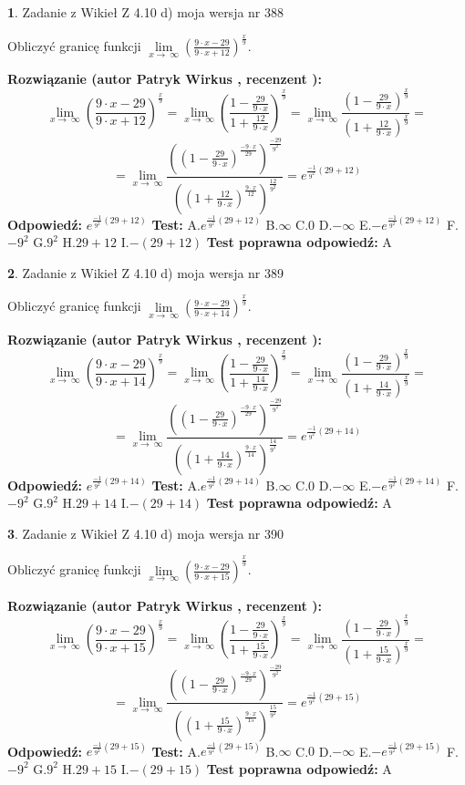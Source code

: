 \documentclass[12pt, a4paper]{article}
\theoremstyle{definition} %
\newtheorem{zad}{}
\newcommand{\zadStart}[1]{\begin{zad}#1\newline}
\newcommand{\zadStop}{\end{zad}}
\newcommand{\rozwStart}[2]{\noindent \textbf{Rozwiązanie (autor #1 , recenzent #2): }\newline}
\newcommand{\rozwStop}{\newline}
\newcommand{\odpStart}{\noindent \textbf{Odpowiedź:}\newline}
\newcommand{\odpStop}{\newline}
\newcommand{\testStart}{\noindent \textbf{Test:}\newline}
\newcommand{\testStop}{\newline}
\newcommand{\kluczStart}{\noindent \textbf{Test poprawna odpowiedź:}\newline}
\newcommand{\kluczStop}{\newline}
\begin{document}
\zadStart{Zadanie z Wikieł Z 4.10 d) moja wersja nr 388}


Obliczyć granicę funkcji  $\lim\limits_{x\to\ \infty}(\frac{9\cdot x-29}{9\cdot x+12})^{\frac{x}{9}}$.
\zadStop
\rozwStart{Patryk Wirkus}{}
$$\lim\limits_{x\to\ \infty}(\frac{9\cdot x-29}{9\cdot x+12})^{\frac{x}{9}} = \lim\limits_{x\to\ \infty}(\frac{1-\frac{29}{9\cdot x}}{1+\frac{12}{9\cdot x}})^{\frac{x}{9}}=\lim\limits_{x\to\ \infty}\frac{(1-\frac{29}{9\cdot x})^{\frac{x}{9}}}{(1+\frac{12}{9\cdot x})^{\frac{x}{9}}}=$$
$$=\lim\limits_{x\to\ \infty}\frac{((1-\frac{29}{9\cdot x})^{\frac{-9\cdot x}{29}})^{\frac{-29}{9^{2}}}}{((1+\frac{12}{9\cdot x})^{\frac{9\cdot x}{12}})^{\frac{12}{9^{2}}}}=e^{\frac{-1}{9^{2}}(29+12)}$$
\rozwStop
\odpStart
$e^{\frac{-1}{9^{2}}(29+12)}$
\odpStop
\testStart
A.$e^{\frac{-1}{9^{2}}(29+12)}$ B.$\infty$ C.$0$ D.$-\infty$ E.$-e^{\frac{-1}{9^{2}}(29+12)}$
F.$-9^{2}$ G.$9^{2}$
H.$29+12$
I.$-(29+12)$
\testStop
\kluczStart
A
\kluczStop



\zadStart{Zadanie z Wikieł Z 4.10 d) moja wersja nr 389}


Obliczyć granicę funkcji  $\lim\limits_{x\to\ \infty}(\frac{9\cdot x-29}{9\cdot x+14})^{\frac{x}{9}}$.
\zadStop
\rozwStart{Patryk Wirkus}{}
$$\lim\limits_{x\to\ \infty}(\frac{9\cdot x-29}{9\cdot x+14})^{\frac{x}{9}} = \lim\limits_{x\to\ \infty}(\frac{1-\frac{29}{9\cdot x}}{1+\frac{14}{9\cdot x}})^{\frac{x}{9}}=\lim\limits_{x\to\ \infty}\frac{(1-\frac{29}{9\cdot x})^{\frac{x}{9}}}{(1+\frac{14}{9\cdot x})^{\frac{x}{9}}}=$$
$$=\lim\limits_{x\to\ \infty}\frac{((1-\frac{29}{9\cdot x})^{\frac{-9\cdot x}{29}})^{\frac{-29}{9^{2}}}}{((1+\frac{14}{9\cdot x})^{\frac{9\cdot x}{14}})^{\frac{14}{9^{2}}}}=e^{\frac{-1}{9^{2}}(29+14)}$$
\rozwStop
\odpStart
$e^{\frac{-1}{9^{2}}(29+14)}$
\odpStop
\testStart
A.$e^{\frac{-1}{9^{2}}(29+14)}$ B.$\infty$ C.$0$ D.$-\infty$ E.$-e^{\frac{-1}{9^{2}}(29+14)}$
F.$-9^{2}$ G.$9^{2}$
H.$29+14$
I.$-(29+14)$
\testStop
\kluczStart
A
\kluczStop



\zadStart{Zadanie z Wikieł Z 4.10 d) moja wersja nr 390}


Obliczyć granicę funkcji  $\lim\limits_{x\to\ \infty}(\frac{9\cdot x-29}{9\cdot x+15})^{\frac{x}{9}}$.
\zadStop
\rozwStart{Patryk Wirkus}{}
$$\lim\limits_{x\to\ \infty}(\frac{9\cdot x-29}{9\cdot x+15})^{\frac{x}{9}} = \lim\limits_{x\to\ \infty}(\frac{1-\frac{29}{9\cdot x}}{1+\frac{15}{9\cdot x}})^{\frac{x}{9}}=\lim\limits_{x\to\ \infty}\frac{(1-\frac{29}{9\cdot x})^{\frac{x}{9}}}{(1+\frac{15}{9\cdot x})^{\frac{x}{9}}}=$$
$$=\lim\limits_{x\to\ \infty}\frac{((1-\frac{29}{9\cdot x})^{\frac{-9\cdot x}{29}})^{\frac{-29}{9^{2}}}}{((1+\frac{15}{9\cdot x})^{\frac{9\cdot x}{15}})^{\frac{15}{9^{2}}}}=e^{\frac{-1}{9^{2}}(29+15)}$$
\rozwStop
\odpStart
$e^{\frac{-1}{9^{2}}(29+15)}$
\odpStop
\testStart
A.$e^{\frac{-1}{9^{2}}(29+15)}$ B.$\infty$ C.$0$ D.$-\infty$ E.$-e^{\frac{-1}{9^{2}}(29+15)}$
F.$-9^{2}$ G.$9^{2}$
H.$29+15$
I.$-(29+15)$
\testStop
\kluczStart
A
\kluczStop
\end{document}
